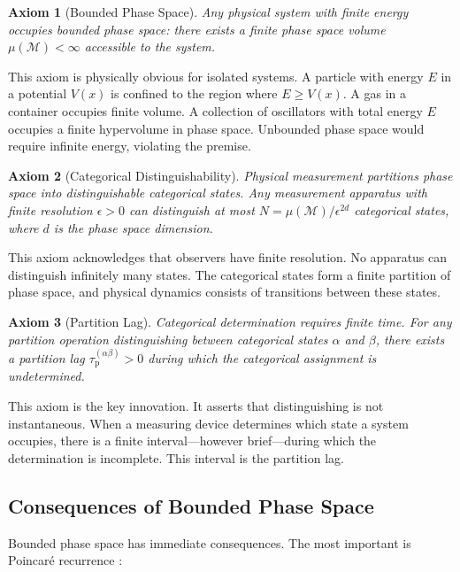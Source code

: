 \documentclass[twocolumn,10pt,aps,prd,superscriptaddress,nofootinbib]{revtex4-2}
\newtheorem{axiom}{Axiom}
\theoremstyle{remark}
\newcommand{\tauP}{\tau_{\mathrm{p}}}
\newcommand{\Mspace}{\mathcal{M}}
\begin{document}
\begin{axiom}[Bounded Phase Space]
\label{axiom:bounded}
Any physical system with finite energy occupies bounded phase space: there exists a finite phase space volume $\mu(\Mspace) < \infty$ accessible to the system.
\end{axiom}

This axiom is physically obvious for isolated systems. A particle with energy $E$ in a potential $V(x)$ is confined to the region where $E \geq V(x)$. A gas in a container occupies finite volume. A collection of oscillators with total energy $E$ occupies a finite hypervolume in phase space. Unbounded phase space would require infinite energy, violating the premise.

\begin{axiom}[Categorical Distinguishability]
\label{axiom:categorical}
Physical measurement partitions phase space into distinguishable categorical states. Any measurement apparatus with finite resolution $\epsilon > 0$ can distinguish at most $N = \mu(\Mspace)/\epsilon^{2d}$ categorical states, where $d$ is the phase space dimension.
\end{axiom}

This axiom acknowledges that observers have finite resolution. No apparatus can distinguish infinitely many states. The categorical states form a finite partition of phase space, and physical dynamics consists of transitions between these states.

\begin{axiom}[Partition Lag]
\label{axiom:lag}
Categorical determination requires finite time. For any partition operation distinguishing between categorical states $\alpha$ and $\beta$, there exists a partition lag $\tauP^{(\alpha\beta)} > 0$ during which the categorical assignment is undetermined.
\end{axiom}

This axiom is the key innovation. It asserts that distinguishing is not instantaneous. When a measuring device determines which state a system occupies, there is a finite interval---however brief---during which the determination is incomplete. This interval is the partition lag.

\subsection{Consequences of Bounded Phase Space}

Bounded phase space has immediate consequences. The most important is Poincar\'{e} recurrence \cite{poincare1890}:
\end{document}
